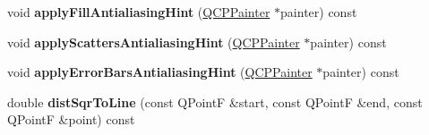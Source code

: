 \begin{DoxyCompactItemize}
\item 
\mbox{\label{class_q_c_p_abstract_plottable_a8d06a59ea23324cce6330ebf2262c0ed}} 
void {\bfseries apply\+Fill\+Antialiasing\+Hint} (\mbox{\hyperlink{class_q_c_p_painter}{Q\+C\+P\+Painter}} $\ast$painter) const
\item 
\mbox{\label{class_q_c_p_abstract_plottable_ac95f26b15a1e5d9c7bd2c0a46d760fc9}} 
void {\bfseries apply\+Scatters\+Antialiasing\+Hint} (\mbox{\hyperlink{class_q_c_p_painter}{Q\+C\+P\+Painter}} $\ast$painter) const
\item 
\mbox{\label{class_q_c_p_abstract_plottable_a0889abc8dbfd357053f40bfafff8bf7d}} 
void {\bfseries apply\+Error\+Bars\+Antialiasing\+Hint} (\mbox{\hyperlink{class_q_c_p_painter}{Q\+C\+P\+Painter}} $\ast$painter) const
\item 
\mbox{\label{class_q_c_p_abstract_plottable_af7e992b638c8aa688abceac579bb90d7}} 
double {\bfseries dist\+Sqr\+To\+Line} (const Q\+PointF \&start, const Q\+PointF \&end, const Q\+PointF \&point) const
\end{DoxyCompactItemize}
